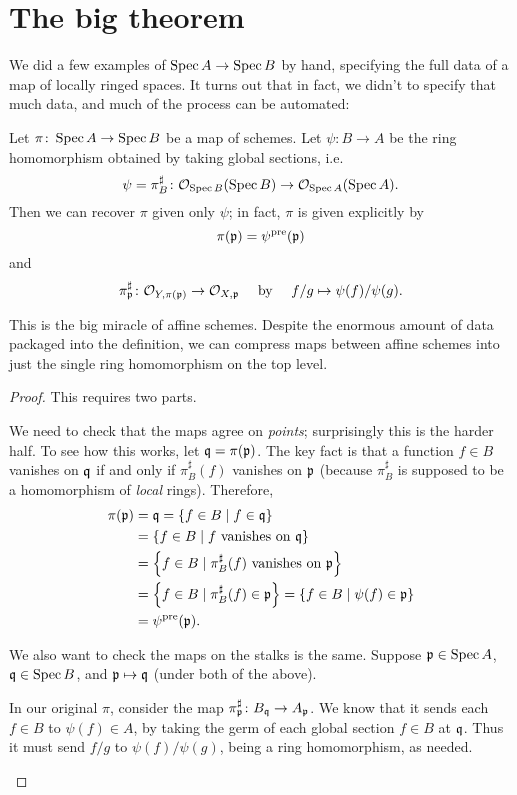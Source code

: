 \section{The big theorem}
We did a few examples of $\operatorname{Spec} A \to \operatorname{Spec} B$ by hand,
specifying the full data of a map of locally ringed spaces.
It turns out that in fact, we didn't to specify that much data,
and much of the process can be automated:
\begin{proposition}
	\label{prop:affine_reconstruction}
	Let $\pi \colon \operatorname{Spec} A \to \operatorname{Spec} B$ be a map of schemes.
	Let $\psi \colon B \to A$ be the ring homomorphism
	obtained by taking global sections, i.e.
	\[ \psi= \pi^\sharp_B \colon \mathcal O_{\operatorname{Spec} B}(\operatorname{Spec} B)
		\to \mathcal O_{\operatorname{Spec} A}(\operatorname{Spec} A). \]
	Then we can recover $\pi$ given only $\psi$;
	in fact, $\pi$ is given explicitly by
	\[ \pi(\mathfrak p) = \psi^{\text{pre}}(\mathfrak p) \]
	and
	\[ \pi^\sharp_\mathfrak p \colon \mathcal O_{Y,\pi(\mathfrak p)} \to \mathcal O_{X,\mathfrak p}
			\quad\text{ by }\quad f/g \mapsto \psi(f)/\psi(g).  \]
\end{proposition}
This is the big miracle of affine schemes.
Despite the enormous amount of data packaged into the definition,
we can compress maps between affine schemes
into just the single ring homomorphism on the top level.
\begin{proof}
	This requires two parts.
	\begin{itemize}
		\ii We need to check that the maps agree on \emph{points};
		surprisingly this is the harder half.
		To see how this works, let $\mathfrak q = \pi(\mathfrak p)$.
		The key fact is that a function $f \in B$ vanishes on $\mathfrak q$
		if and only if $\pi^\sharp_B(f)$ vanishes on $\mathfrak p$
		(because $\pi^\sharp_B$ is supposed to be a
		homomorphism of \emph{local} rings).
		Therefore,
		\begin{align*}
			\pi(\mathfrak p) &= \mathfrak q = \left\{ f \in B \mid f \in \mathfrak q \right\} \\
			&= \left\{ f \in B \mid f \text{ vanishes on } \mathfrak q \right\} \\
			&= \left\{ f \in B \mid \pi^\sharp_B(f) \text{ vanishes on } \mathfrak p \right\} \\
			&= \left\{ f \in B \mid \pi^\sharp_B(f) \in \mathfrak p \right\}
			= \left\{ f \in B \mid \psi(f) \in \mathfrak p \right\} \\
			&= \psi^{\text{pre}}(\mathfrak p).
		\end{align*}

		\ii We also want to check the maps on the stalks is the same.
		Suppose $\mathfrak p \in \operatorname{Spec} A$, $\mathfrak q \in \operatorname{Spec} B$,
		and $\mathfrak p \mapsto \mathfrak q$ (under both of the above).

		In our original $\pi$, consider the map
		$\pi^\sharp_\mathfrak p \colon B_\mathfrak q \to A_\mathfrak p$.
		We know that it sends each $f \in B$ to $\psi(f) \in A$,
		by taking the germ of each global section $f \in B$ at $\mathfrak q$.
		Thus it must send $f/g$ to $\psi(f) / \psi(g)$,
		being a ring homomorphism, as needed. \qedhere
	\end{itemize}
\end{proof}

